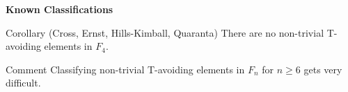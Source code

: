 \documentclass{beamer}
\newcommand\heapblock[4]{\fill[fill=#4, fill opacity=0.35, draw=#4, line width=1.1pt, rounded corners,shift={(\xxaxis:#1)},shift={(\yyaxis:#2)}] (-1,-1) rectangle (1,1);\node at (#1,#2) {\footnotesize $#3$};}
\newcommand\xxaxis{0}
\newcommand\yyaxis{90}
\begin{document}
\begin{frame}{\textbf{Known Classifications}}

\begin{block}{Corollary (Cross, Ernst, Hills-Kimball, Quaranta)}
There are no non-trivial T-avoiding elements in $F_4$.	
\end{block}
\pause

\begin{block}{Comment}
Classifying non-trivial T-avoiding elements in $F_n$ for $n \geq 6$ gets very difficult.	
\end{block}

\vspace{-1em}

\begin{figure}\centering
{}
\end{figure}


\end{frame}




%
%


\end{document}
